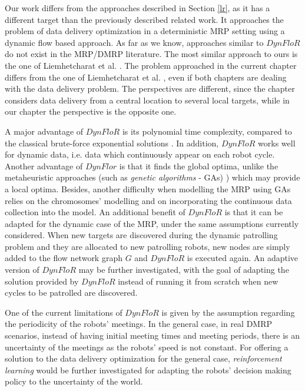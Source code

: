 Our work differs from the approaches described in Section \ref{lr}, as it has a different target than the previously described related work. It approaches the problem of data delivery optimization in a deterministic MRP setting using a dynamic flow based approach. As far as we know, approaches similar to $DynFloR$ do not exist in the MRP/DMRP literature. The most similar  approach to ours is the one of Liemhetcharat et al. \cite{Liemhetcharat2015}. The problem approached in the current chapter differs from the one of Liemhetcharat et al. \cite{Liemhetcharat2015}, even if both chapters are dealing with the data delivery problem. The perspectives are different, since the chapter \cite{Liemhetcharat2015} considers data delivery from a central location to several local targets, while in our chapter the perspective is the opposite one. 

A major advantage of $DynFloR$ is its polynomial time complexity, compared to the classical brute-force exponential solutions \cite{Romeo2018}. In addition, $DynFloR$ works well for dynamic data, i.e. data which continuously appear on each robot cycle. Another advantage of $DynFlor$ is that it finds the global optima, unlike the metaheuristic approaches (such as \emph{genetic algorithms} - GAs) \cite{portugal_2011}) which may provide a local optima. Besides, another difficulty when modelling the MRP using GAs relies on the chromosomes' modelling and on incorporating the continuous data collection into the model. An additional benefit of $DynFloR$ is that it can be adapted for the dynamic case of the MRP, under the same assumptions currently considered. When new targets are discovered during the dynamic patrolling problem and they are allocated to new patrolling robots, new nodes are simply added to the flow network graph $G$ and $DynFloR$ is executed again. An adaptive version of $DynFloR$ may be further investigated, with the goal of adapting the solution provided by $DynFloR$ instead of running it from scratch when new cycles to be patrolled are discovered.  

One of the current limitations of $DynFloR$ is given by the assumption regarding the periodicity of the robots' meetings. In the general case, in real DMRP scenarios,  instead of having initial meeting times and meeting periods, there is an uncertainty of the meetings as the robots' speed is not constant. For offering a solution to the data delivery optimization for the general case, \emph{reinforcement learning} would be further investigated  for adapting the robots'  decision making policy to the uncertainty of the world.  



